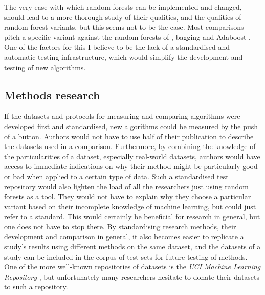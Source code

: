 \documentclass[a4paper,man,12pt,apacite,floatsintext,draftfirst]{apa6} %
\begin{document}
The very ease with which random forests can be implemented and changed,
should lead to a more thorough study of their qualities,
and the qualities of random forest variants, but this seems not to be the case.
Most comparisons pitch a specific variant against the random forests
of , bagging \cite{breiman1996bagging}
and Adaboost \cite{freund1995decision}.
One of the factors for this I believe to be the lack of a standardised
and automatic testing infrastructure, which would simplify the development
and testing of new algorithms.

\subsection{Methods research}
If the datasets and protocols for measuring and comparing algorithms were
developed first and standardised, new algorithms could be measured by the
push of a button.
Authors would not have to use half of their publication
to describe the datasets used in a comparison.
Furthermore, by combining the knowledge of the particularities of a dataset,
especially real-world datasets, authors would have access to immediate
indications on why their method might be particularly good or bad when applied
to a certain type of data.
Such a standardised test repository would also lighten the load of all the
researchers just using random forests as a tool.
They would not have to explain why they choose a particular variant based on
their incomplete knowledge of machine learning, but could just refer to
a standard.
This would certainly be beneficial for research in general, but one does not have
to stop there.
By standardising research methods, their development and comparison
in general, it also becomes easier to replicate a study's results using
different methods on the same dataset, and the datasets of a study can
be included in the corpus of test-sets for future testing of methods.
One of the more well-known repositories of datasets is the \emph{UCI Machine Learning Repository}
\cite{UCIrepo}, but unfortunately many researchers hesitate to donate their
datasets to such a repository.
\end{document}
